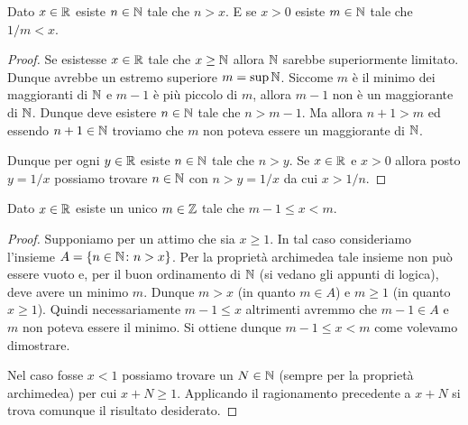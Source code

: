 \begin{theorem}
\mymark{**}
Dato $x\in \mathbb R$ esiste $n\in \mathbb N$ tale che $n > x$.
E se $x>0$ esiste $m\in \mathbb N$ tale che $1/m < x$.
\end{theorem}
%
\begin{proof}
\mymark{*}
Se esistesse $x\in \mathbb R$ tale che $x \ge \mathbb N$
allora $\mathbb N$ sarebbe superiormente limitato.
Dunque avrebbe un estremo superiore $m= \sup \mathbb N$.
Siccome $m$ è il minimo dei maggioranti di $\mathbb N$
e $m-1$ è più piccolo di $m$, allora $m-1$ non è un maggiorante
di $\mathbb N$. Dunque deve esistere $n\in \mathbb N$ tale che $n>m-1$.
Ma allora $n+1 > m$ ed essendo $n+1\in \mathbb N$ troviamo che $m$
non poteva essere un maggiorante di $\mathbb N$.

Dunque per ogni $y\in \mathbb R$ esiste $n\in \mathbb N$ tale che $n>y$.
Se $x\in \mathbb R$ e $x>0$ allora posto $y=1/x$ possiamo trovare
$n\in \mathbb N$ con $n>y = 1/x$ da cui $x > 1/n$.
\end{proof}

\begin{theorem}
\mymark{*}
Dato $x\in \mathbb R$ esiste un unico $m\in \mathbb Z$ tale che $m-1 \le x < m$.
\end{theorem}
%
\begin{proof}
Supponiamo per un attimo che sia $x\ge 1$.
In tal caso consideriamo l'insieme $A=\{n\in \mathbb N\colon n > x\}$.
Per la proprietà archimedea tale insieme non può essere vuoto e,
per il buon ordinamento di $\mathbb N$ (si vedano gli appunti di logica),
deve avere un minimo $m$.
Dunque $m>x$ (in quanto $m\in A$) e $m\ge 1$ (in quanto $x\ge 1$).
Quindi necessariamente $m-1 \le x$ altrimenti avremmo che $m-1\in A$ e $m$
non poteva essere il minimo. Si ottiene dunque $m-1\le x < m$ come volevamo
dimostrare.

Nel caso fosse $x<1$ possiamo trovare un $N\in \mathbb N$ (sempre per la proprietà archimedea) per cui $x+N \ge 1$. Applicando il ragionamento precedente a $x+N$ si trova comunque il risultato desiderato.
\end{proof}

